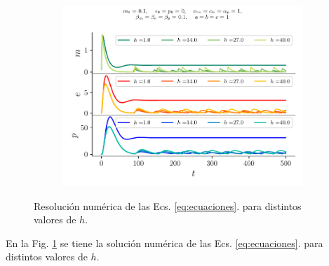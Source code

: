 \documentclass[twocolumn,aps,prl]{revtex4-1}
\begin{document}
\begin{figure}[ht!]
  \centering
  \begin{subfigure}[b]{0.65\linewidth}
      \centering
      \includegraphics[width = 0.999\textwidth]{figuras/ex01-concentracion-h.pdf}
  \end{subfigure}\quad
  \caption{Resolución numérica de las Ecs. \ref{eq:ecuaciones}. para distintos valores de $h$.}
  \label{fig:figuras/ex01-concentracion-h}
\end{figure}

En la Fig. \ref{fig:figuras/ex01-concentracion-h} se tiene la solución numérica de las Ecs. \ref{eq:ecuaciones}. para distintos valores de $h$.
\end{document}
